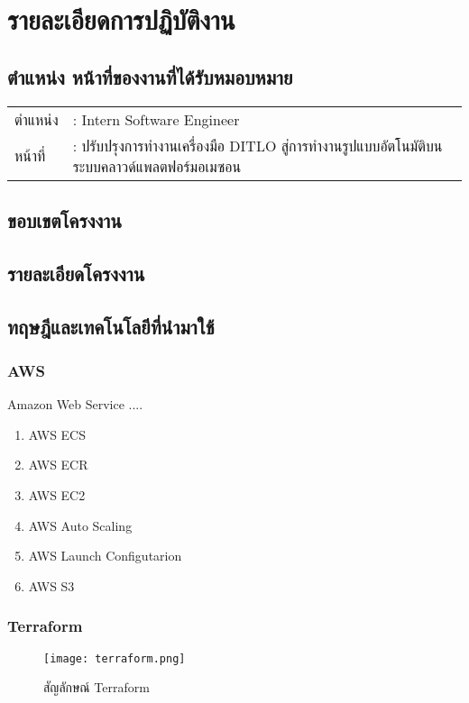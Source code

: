 \chapter{รายละเอียดการปฏิบัติงาน}
\label{chapter:related-theory}

\section{ตำแหน่ง หน้าที่ของงานที่ได้รับหมอบหมาย}
\begin{table}[h]
    \begin{tabular}{ll}
    ตำแหน่ง & : Intern Software Engineer \\
    หน้าที่   & : ปรับปรุงการทำงานเครื่องมือ DITLO สู่การทำงานรูปแบบอัตโนมัติบนระบบคลาวด์แพลตฟอร์มอเมซอน
    \end{tabular}
\end{table}

\section{ขอบเขตโครงงาน}

\section{รายละเอียดโครงงาน}


\section{ทฤษฎีและเทคโนโลยีที่นำมาใช้}
\subsection{AWS}
Amazon Web Service ....
\begin{enumerate}
    \item AWS ECS
    \item AWS ECR
    \item AWS EC2
    \item AWS Auto Scaling
    \item AWS Launch Configutarion
    \item AWS S3
\end{enumerate}

\newpage
\subsection{Terraform}
\begin{figure}[ht]
    \centering
    \texttt{[image: terraform.png]}
    \caption{สัญลักษณ์ Terraform}
    \label{fig:Terraform-icon}
\end{figure}

